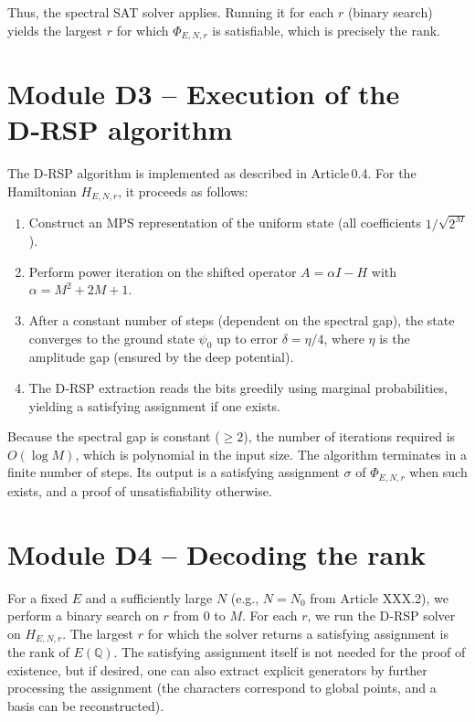 \documentclass[11pt,a4paper]{article}
\begin{document}
Thus, the spectral SAT solver applies. Running it for each \(r\) (binary search) yields the largest \(r\) for which \(\Phi_{E,N,r}\) is satisfiable, which is precisely the rank.

\section{Module D3 – Execution of the D‑RSP algorithm}

The D‑RSP algorithm is implemented as described in Article 0.4. For the Hamiltonian \(H_{E,N,r}\), it proceeds as follows:

\begin{enumerate}
\item Construct an MPS representation of the uniform state (all coefficients \(1/\sqrt{2^M}\)).
\item Perform power iteration on the shifted operator \(A = \alpha I - H\) with \(\alpha = M^2 + 2M + 1\).
\item After a constant number of steps (dependent on the spectral gap), the state converges to the ground state \(\psi_0\) up to error \(\delta = \eta/4\), where \(\eta\) is the amplitude gap (ensured by the deep potential).
\item The D‑RSP extraction reads the bits greedily using marginal probabilities, yielding a satisfying assignment if one exists.
\end{enumerate}

Because the spectral gap is constant (\( \ge 2\)), the number of iterations required is \(O(\log M)\), which is polynomial in the input size. The algorithm terminates in a finite number of steps. Its output is a satisfying assignment \(\sigma\) of \(\Phi_{E,N,r}\) when such exists, and a proof of unsatisfiability otherwise.

\section{Module D4 – Decoding the rank}

For a fixed \(E\) and a sufficiently large \(N\) (e.g., \(N = N_0\) from Article XXX.2), we perform a binary search on \(r\) from \(0\) to \(M\). For each \(r\), we run the D‑RSP solver on \(H_{E,N,r}\). The largest \(r\) for which the solver returns a satisfying assignment is the rank of \(E(\mathbb{Q})\). The satisfying assignment itself is not needed for the proof of existence, but if desired, one can also extract explicit generators by further processing the assignment (the characters correspond to global points, and a basis can be reconstructed).
\end{document}
